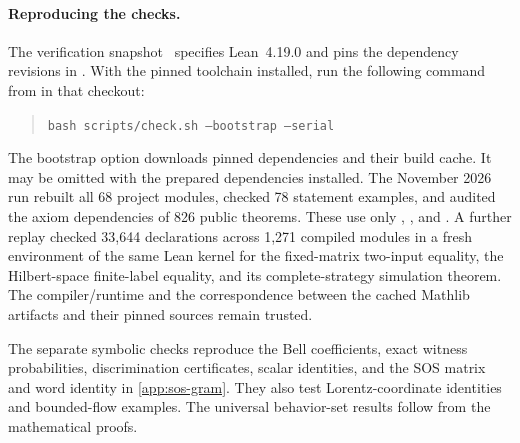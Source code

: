 \paragraph{Reproducing the checks.}
The verification snapshot~\cite{kriebel2026verification} specifies
Lean~4.19.0 and pins the dependency revisions in .
With the pinned toolchain installed, run the following command from
 in that checkout:
\begin{quote}
\texttt{bash scripts/check.sh --bootstrap --serial}
\end{quote}
The bootstrap option downloads pinned dependencies and their build cache.
It may be omitted with the prepared dependencies installed.
The November 2026 run rebuilt all 68 project modules, checked 78
statement examples, and audited the axiom dependencies of 826 public
theorems. These use only , , and
. A further replay checked 33,644 declarations across
1,271 compiled modules in a fresh environment of the same Lean kernel for
the fixed-matrix two-input equality, the Hilbert-space finite-label
equality, and its complete-strategy simulation theorem. The compiler/runtime and the
correspondence between the cached Mathlib artifacts and their pinned
sources remain trusted.

The separate symbolic checks reproduce the Bell coefficients, exact
witness probabilities, discrimination certificates, scalar identities,
and the SOS matrix and word identity in \cref{app:sos-gram}. They also
test Lorentz-coordinate identities and bounded-flow examples. The
universal behavior-set results follow from the mathematical proofs.
